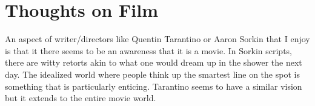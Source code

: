 \documentclass[10pt,letterpaper]{scrartcl}
\begin{document}
\newpage\section{Thoughts on Film}
An aspect of writer/directors like Quentin Tarantino or Aaron Sorkin that I enjoy is that it there seems to be an awareness that it is a movie. In Sorkin scripts, there are witty retorts akin to what one would dream up in the shower the next day. The idealized world where people think up the smartest line on the spot is something that is particularly enticing. Tarantino seems to have a similar vision but it extends to the entire movie world. 
\end{document}
